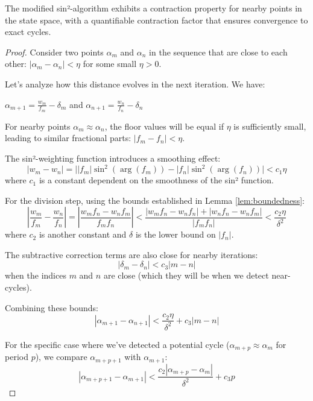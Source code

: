 \begin{lemma}\label{lem:contraction}
The modified sin²-algorithm exhibits a contraction property for nearby points in the state space, with a quantifiable contraction factor that ensures convergence to exact cycles.
\end{lemma}

\begin{proof}
Consider two points $\alpha_m$ and $\alpha_n$ in the sequence that are close to each other: $|\alpha_m - \alpha_n| < \eta$ for some small $\eta > 0$.

Let's analyze how this distance evolves in the next iteration. We have:

$\alpha_{m+1} = \frac{w_m}{f_m} - \delta_m$ and $\alpha_{n+1} = \frac{w_n}{f_n} - \delta_n$

For nearby points $\alpha_m \approx \alpha_n$, the floor values will be equal if $\eta$ is sufficiently small, leading to similar fractional parts: $|f_m - f_n| < \eta$.

The sin²-weighting function introduces a smoothing effect:
\begin{equation}
|w_m - w_n| = \big||f_m|\sin^2(\arg(f_m)) - |f_n|\sin^2(\arg(f_n))\big| < c_1\eta
\end{equation}
where $c_1$ is a constant dependent on the smoothness of the sin² function.

For the division step, using the bounds established in Lemma \ref{lem:boundedness}:
\begin{equation}
\left|\frac{w_m}{f_m} - \frac{w_n}{f_n}\right| = \left|\frac{w_m f_n - w_n f_m}{f_m f_n}\right| < \frac{|w_m f_n - w_n f_n| + |w_n f_n - w_n f_m|}{|f_m f_n|} < \frac{c_2\eta}{\delta^2}
\end{equation}
where $c_2$ is another constant and $\delta$ is the lower bound on $|f_n|$.

The subtractive correction terms are also close for nearby iterations:
\begin{equation}
|\delta_m - \delta_n| < c_3|m-n|
\end{equation}
when the indices $m$ and $n$ are close (which they will be when we detect near-cycles).

Combining these bounds:
\begin{equation}
|\alpha_{m+1} - \alpha_{n+1}| < \frac{c_2\eta}{\delta^2} + c_3|m-n|
\end{equation}

For the specific case where we've detected a potential cycle ($\alpha_{m+p} \approx \alpha_m$ for period $p$), we compare $\alpha_{m+p+1}$ with $\alpha_{m+1}$:
\begin{equation}
|\alpha_{m+p+1} - \alpha_{m+1}| < \frac{c_2|\alpha_{m+p} - \alpha_m|}{\delta^2} + c_3p
\end{equation}


\end{proof}
